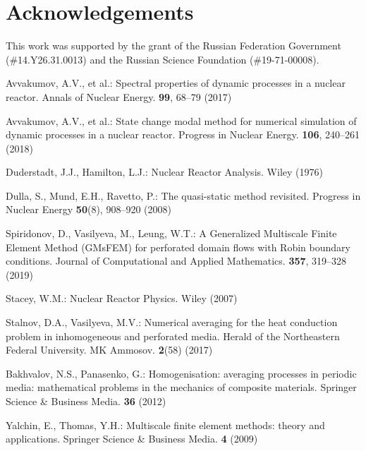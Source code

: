 \documentclass[runningheads]{llncs}
\begin{document}
\section*{Acknowledgements}
This work was supported by the grant of the Russian Federation Government
(\#14.Y26.31.0013) and the Russian Science Foundation (\#19-71-00008).

\begin{thebibliography}{8}

Avvakumov, A.V., et al.: Spectral properties of dynamic processes in a nuclear reactor. Annals of Nuclear Energy. \textbf{99}, 68--79 (2017) 

Avvakumov, A.V., et al.: State change modal method for numerical simulation of dynamic processes in a nuclear reactor. Progress in Nuclear Energy. \textbf{106}, 240--261 (2018)

Duderstadt, J.J., Hamilton, L.J.: Nuclear Reactor Analysis. Wiley (1976)

Dulla, S., Mund, E.H., Ravetto, P.: The quasi-static method revisited. Progress in Nuclear Energy \textbf{50}(8), 908--920 (2008)

Spiridonov, D., Vasilyeva, M., Leung, W.T.: A Generalized Multiscale Finite Element Method (GMsFEM) for perforated domain flows with Robin boundary conditions. Journal of Computational and Applied Mathematics. \textbf{357}, 319--328 (2019)

Stacey, W.M.: Nuclear Reactor Physics. Wiley (2007)

Stalnov, D.A., Vasilyeva, M.V.: Numerical averaging for the heat conduction problem in inhomogeneous and perforated media. Herald of the Northeastern Federal University. MK Ammosov. \textbf{2}(58) (2017)

Bakhvalov, N.S., Panasenko, G.: Homogenisation: averaging processes in periodic media: mathematical problems in the mechanics of composite materials. Springer Science
\& Business Media.  \textbf{36} (2012)

Yalchin, E., Thomas, Y.H.: Multiscale finite element methods: theory and applications.
Springer Science \& Business Media. \textbf{4} (2009)

\end{thebibliography}
\end{document}
